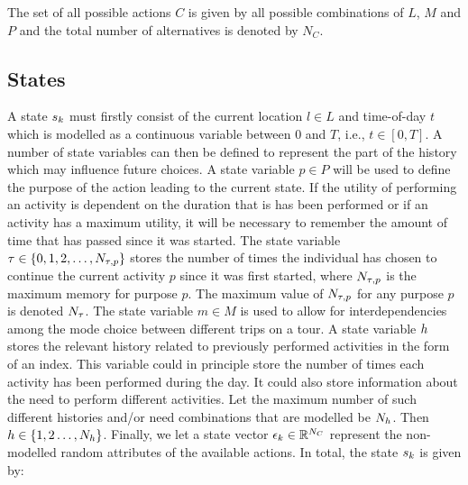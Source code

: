 The set of all possible actions $C$ is given by all possible combinations of $L$, $M$ and $P$ and the total number of alternatives is denoted by
$N_C$.
\subsection{States}
 A state $s_{k}$ must firstly consist of the current location $l \in L$ and time-of-day $t$ which is modelled as a continuous variable between 0 and $T$, i.e., $t\in [0,T]$. A number of state variables can then be defined to represent the part of the history which may influence future choices. 
A state variable $p \in P$ will be used to define the purpose of the action leading to the current state. If the utility of performing an activity is dependent on the duration that is has been performed or if an activity has a maximum utility, it will be necessary to remember the amount of time that has passed since it was started. The state variable $\tau \in \{0,1,2,\dots,N_{\tau,p} \}$ stores the number of times the individual has chosen to continue the current activity $p$ since it was first started, where $N_{\tau,p}$ is the maximum memory for purpose $p$. The maximum value of $N_{\tau,p}$ for any purpose $p$ is denoted $N_\tau$. The state variable $m \in M$ is used to allow for interdependencies among the mode choice between different trips on a tour. 
A state variable $h$ stores the relevant history related to previously performed activities in the form of an index. This variable could in principle store the number of times each activity has been performed during the day. It could also store information about the need to perform different activities. Let the maximum number of such different histories and/or need combinations that are modelled be $N_h$. Then $h\in\{1,2\dots,{N_h} \}$. Finally, we let a state vector $\epsilon_k \in \mathbb{R}^{N_C}$ represent the non-modelled random attributes of the available actions. In total, the state $s_{k}$ is given by:
